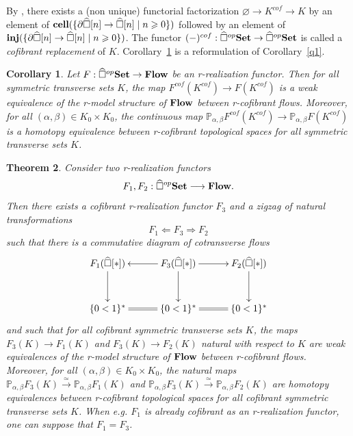 \documentclass[a4paper,12pt]{amsart}
\makeatletter
\newcommand{\de}{\partial}
\newcommand{\p}{\times}
\newtheorem{thm}{Theorem}[section]
\newtheorem{cor}[thm]{Corollary}
\newcommand{\bth}{\begin{thm}}
\renewcommand{\eth}{\end{thm}}
\theoremstyle{definition}
\newcommand{\fl}[1]{\ar@{->}[l]_-{#1}}
\newcommand{\fr}[1]{\ar@{->}[r]^-{#1}}
\newcommand{\fd}[1]{\ar@{->}[d]_-{#1}}
\renewcommand{\geq}{\geqslant}
\newcommand{\brm}[1]{{\rm{\mathbf{#1}}}}
\newcommand{\dtop}{{\brm{Flow}}}
\newcommand{\set}{{\brm{Set}}}
\renewcommand{\P}{\mathbb{P}}
\DeclareMathOperator{\cell}{{\brm{cell}}}
\DeclareMathOperator{\inj}{{\brm{inj}}}
\makeatother
\begin{document}
By \cite[Proposition~1.3]{MR1780498}, there exists a (non unique) functorial factorization $\varnothing \to K^{cof}\to K$ by an element of $\cell(\{\de\widehat{\square}[n]\to \widehat{\square}[n]\mid n\geq 0\})$ followed by an element of $\inj(\{\de\widehat{\square}[n]\to \widehat{\square}[n]\mid n\geq 0\})$. The functor $(-)^{cof}:\widehat{\square}^{op}\set \to \widehat{\square}^{op}\set$ is called a \textit{cofibrant replacement} of $K$. Corollary~\ref{q2} is a reformulation of Corollary~\ref{q1}.


\begin{cor} \label{q2}
	Let $F:\widehat{\square}^{op}\set \to \dtop$ be an r-realization functor. Then for all symmetric transverse sets $K$, the map $F^{cof}(K^{cof})\to F(K^{cof})$ is a weak equivalence of the r-model structure of $\dtop$ between r-cofibrant flows. Moreover, for all $(\alpha,\beta)\in K_0\p K_0$, the continuous map $\P_{\alpha,\beta}F^{cof}(K^{cof})\to \P_{\alpha,\beta}F(K^{cof})$ is a homotopy equivalence between r-cofibrant topological spaces for all symmetric transverse sets $K$.
\end{cor}


\bth \label{homotopy-natural}
Consider two r-realization functors \[F_1,F_2:\widehat{\square}^{op}\set \longrightarrow \dtop.\] Then there exists a cofibrant r-realization functor $F_3$ and a zigzag of natural transformations \[F_1\Longleftarrow F_3 \Longrightarrow F_2\] such that there is a commutative diagram of cotransverse flows 
\[
\xymatrix@C=3em@R=3em
{
	F_1(\widehat{\square}[*])\fd{} &\fl{} F_3(\widehat{\square}[*]) \fd{}\fr{} & F_2(\widehat{\square}[*]) \fd{} \\
	{\{0<1\}^*} \ar@{=}[r] & {\{0<1\}^*} \ar@{=}[r] & {\{0<1\}^*}
}
\]
and such that for all cofibrant symmetric transverse sets $K$, the maps $F_3(K)\to F_1(K)$ and $F_3(K)\to F_2(K)$ natural with respect to $K$ are weak equivalences of the r-model structure of $\dtop$ between r-cofibrant flows. Moreover, for all $(\alpha,\beta)\in K_0\p K_0$, the natural maps $\P_{\alpha,\beta}F_3(K)\stackrel{\simeq}\longrightarrow \P_{\alpha,\beta}F_1(K)$ and $\P_{\alpha,\beta}F_3(K)\stackrel{\simeq}\longrightarrow \P_{\alpha,\beta}F_2(K)$ are homotopy equivalences between r-cofibrant topological spaces for all cofibrant symmetric transverse sets $K$. When e.g. $F_1$ is already cofibrant as an r-realization functor, one can suppose that $F_1=F_3$.
\eth
\end{document}
